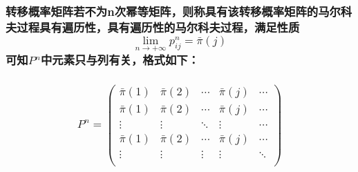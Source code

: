 \documentclass[11pt]{article}
\begin{document}
\subsubsection{\texorpdfstring{转移概率矩阵若不为n次幂等矩阵，则称具有该转移概率矩阵的马尔科夫过程具有遍历性，具有遍历性的马尔科夫过程，满足性质\[\lim_{n\to+\infty}p_{ij}^n=\bar\pi(j)\]可知\(P^n\)中元素只与列有关，格式如下：}{转移概率矩阵若不为n次幂等矩阵，则称具有该转移概率矩阵的马尔科夫过程具有遍历性，具有遍历性的马尔科夫过程，满足性质\textbackslash{}lim\_\{n\textbackslash{}to+\textbackslash{}infty\}p\_\{ij\}\^{}n=\textbackslash{}bar\textbackslash{}pi(j)可知P\^{}n中元素只与列有关，格式如下：}}\label{ux8f6cux79fbux6982ux7387ux77e9ux9635ux82e5ux4e0dux4e3anux6b21ux5e42ux7b49ux77e9ux9635ux5219ux79f0ux5177ux6709ux8be5ux8f6cux79fbux6982ux7387ux77e9ux9635ux7684ux9a6cux5c14ux79d1ux592bux8fc7ux7a0bux5177ux6709ux904dux5386ux6027ux5177ux6709ux904dux5386ux6027ux7684ux9a6cux5c14ux79d1ux592bux8fc7ux7a0bux6ee1ux8db3ux6027ux8d28lim_ntoinftyp_ijnbarpijux53efux77e5pnux4e2dux5143ux7d20ux53eaux4e0eux5217ux6709ux5173ux683cux5f0fux5982ux4e0b}

\subsubsection{\texorpdfstring{\[ P^n=
        \left (\begin{matrix}
        \bar\pi(1) & \bar\pi(2) & \cdots &\bar\pi(j)& \cdots  \\
        \bar\pi(1)  & \bar\pi(2) & \cdots &\bar\pi(j)& \cdots \\
        \vdots & \vdots & \ddots & \vdots & \cdots \\
       \bar\pi(1) & \bar\pi(2) & \cdots & \bar\pi(j) & \cdots \\
        \vdots & \vdots & \vdots & \vdots & \ddots \\
        \end{matrix} \right)\]}{ P\^{}n=
        \textbackslash{}left (\textbackslash{}begin\{matrix\}
        \textbackslash{}bar\textbackslash{}pi(1) \& \textbackslash{}bar\textbackslash{}pi(2) \& \textbackslash{}cdots \&\textbackslash{}bar\textbackslash{}pi(j)\& \textbackslash{}cdots  \textbackslash{}\textbackslash{}
        \textbackslash{}bar\textbackslash{}pi(1)  \& \textbackslash{}bar\textbackslash{}pi(2) \& \textbackslash{}cdots \&\textbackslash{}bar\textbackslash{}pi(j)\& \textbackslash{}cdots \textbackslash{}\textbackslash{}
        \textbackslash{}vdots \& \textbackslash{}vdots \& \textbackslash{}ddots \& \textbackslash{}vdots \& \textbackslash{}cdots \textbackslash{}\textbackslash{}
       \textbackslash{}bar\textbackslash{}pi(1) \& \textbackslash{}bar\textbackslash{}pi(2) \& \textbackslash{}cdots \& \textbackslash{}bar\textbackslash{}pi(j) \& \textbackslash{}cdots \textbackslash{}\textbackslash{}
        \textbackslash{}vdots \& \textbackslash{}vdots \& \textbackslash{}vdots \& \textbackslash{}vdots \& \textbackslash{}ddots \textbackslash{}\textbackslash{}
        \textbackslash{}end\{matrix\} \textbackslash{}right)}}\label{pn-left-beginmatrix-barpi1-barpi2-cdots-barpij-cdots-barpi1-barpi2-cdots-barpij-cdots-vdots-vdots-ddots-vdots-cdots-barpi1-barpi2-cdots-barpij-cdots-vdots-vdots-vdots-vdots-ddots-endmatrix-right}
\end{document}

